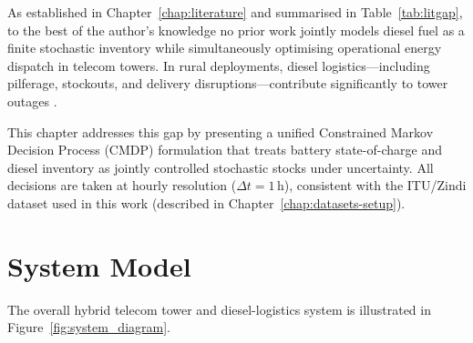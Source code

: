As established in Chapter~\ref{chap:literature} and summarised in
Table~\ref{tab:litgap}, to the best of the author's knowledge no prior work
jointly models diesel fuel as a finite stochastic inventory while
simultaneously optimising operational energy dispatch in telecom towers.
In rural deployments, diesel logistics---including pilferage, stockouts, and
delivery disruptions---contribute significantly to tower outages
\citep{datoms2024,alton2025,gsma2025b,trai2024}.

This chapter addresses this gap by presenting a unified Constrained Markov
Decision Process (CMDP) formulation that treats battery state-of-charge and
diesel inventory as jointly controlled stochastic stocks under uncertainty.
All decisions are taken at hourly resolution ($\Delta t = 1$\,h), consistent
with the ITU/Zindi dataset used in this work (described in
Chapter~\ref{chap:datasets-setup}).


\section{System Model}

The overall hybrid telecom tower and diesel-logistics system is illustrated in
Figure~\ref{fig:system_diagram}.

